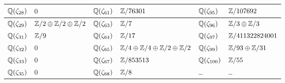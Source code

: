 \begin{center}
\begin{tabular}{x{1cm}x{3cm}x{1cm}x{3.5cm}x{1.15cm}x{3.5cm}}
$\mathbb{Q} (\zeta_{28})$ & $0$ & $\mathbb{Q} (\zeta_{61})$ & $\mathbb{Z}/76301$ & $\mathbb{Q} (\zeta_{95})$ & $\mathbb{Z}/107692$ \tabularnewline\hline
$\mathbb{Q} (\zeta_{29})$ & $\mathbb{Z}/2\oplus\mathbb{Z}/2\oplus\mathbb{Z}/2$ & $\mathbb{Q} (\zeta_{63})$ & $\mathbb{Z}/7$ & $\mathbb{Q} (\zeta_{96})$ & $\mathbb{Z}/3\oplus\mathbb{Z}/3$ \tabularnewline\hline
$\mathbb{Q} (\zeta_{31})$ & $\mathbb{Z}/9$ & $\mathbb{Q} (\zeta_{64})$ & $\mathbb{Z}/17$ & $\mathbb{Q} (\zeta_{97})$ & $\mathbb{Z}/411322824001$ \tabularnewline\hline
$\mathbb{Q} (\zeta_{32})$ & $0$ & $\mathbb{Q} (\zeta_{65})$ & $\mathbb{Z}/4\oplus\mathbb{Z}/4\oplus\mathbb{Z}/2\oplus\mathbb{Z}/2$ & $\mathbb{Q} (\zeta_{99})$ & $\mathbb{Z}/93\oplus\mathbb{Z}/31$ \tabularnewline\hline
$\mathbb{Q} (\zeta_{33})$ & $0$ & $\mathbb{Q} (\zeta_{67})$ & $\mathbb{Z}/853513$ & $\mathbb{Q} (\zeta_{100})$ & $\mathbb{Z}/55$ \tabularnewline\hline
$\mathbb{Q} (\zeta_{35})$ & $0$ & $\mathbb{Q} (\zeta_{68})$ & $\mathbb{Z}/8$ & \dots & \dots\tabularnewline\hline
\end{tabular}

\end{center}
